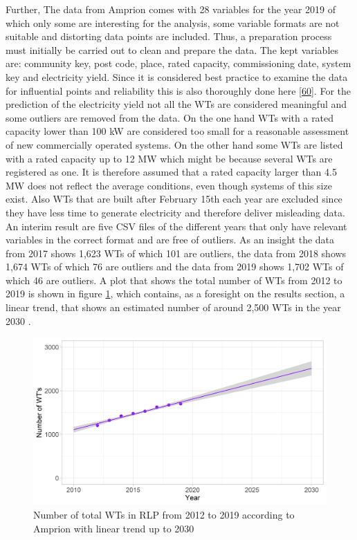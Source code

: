 \documentclass[a4paper,11pt]{article}
\begin{document}
Further, The data from Amprion comes with 28 variables for the year 2019 of which only some are interesting for the analysis, some variable formats are not suitable and distorting data points are included. Thus, a preparation process must initially be carried out to clean and prepare the data. The kept variables are: community key, post code, place, rated capacity, commissioning date, system key and electricity yield. Since it is considered best practice to examine the data for influential points and reliability this is also thoroughly done here {[}\protect\hyperlink{ref-JasonW.Osborne.2013}{60}{]}. For the prediction of the electricity yield not all the WTs are considered meaningful and some outliers are removed from the data. On the one hand WTs with a rated capacity lower than 100 kW are considered too small for a reasonable assessment of new commercially operated systems. On the other hand some WTs are listed with a rated capacity up to 12 MW which might be because several WTs are registered as one. It is therefore assumed that a rated capacity larger than 4.5 MW does not reflect the average conditions, even though systems of this size exist. Also WTs that are built after February 15th each year are excluded since they have less time to generate electricity and therefore deliver misleading data. An interim result are five CSV files of the different years that only have relevant variables in the correct format and are free of outliers. As an insight the data from 2017 shows 1,623 WTs of which 101 are outliers, the data from 2018 shows 1,674 WTs of which 76 are outliers and the data from 2019 shows 1,702 WTs of which 46 are outliers. A plot that shows the total number of WTs from 2012 to 2019 is shown in figure \ref{fig:yearswts}, which contains, as a foresight on the results section, a linear trend, that shows an estimated number of around 2,500 WTs in the year 2030 .
\begin{figure}[H]

{\centering \includegraphics[width=1\linewidth]{data/Amprion/results_of_analysis/year_wts} 

}

\caption{Number of total WTs in RLP from 2012 to 2019 according to Amprion with linear trend up to 2030}\label{fig:yearswts}
\end{figure}
\end{document}
